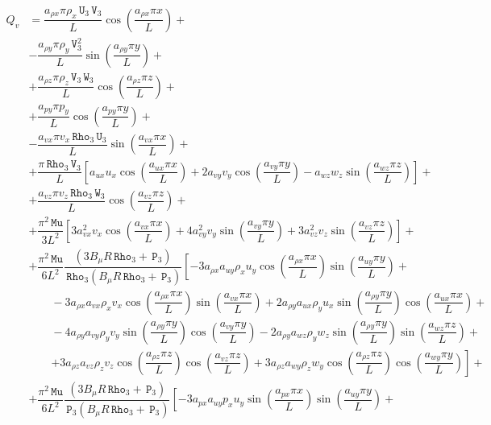 \documentclass[10pt]{article}
\newcommand{\Rho}{\,\mathtt{Rho}}
\newcommand{\PP}{\,\mathtt{P}}
\newcommand{\U}{\,\mathtt{U}}
\newcommand{\V}{\,\mathtt{V}}
\newcommand{\W}{\,\mathtt{W}}
\newcommand{\MU}{\,\mathtt{Mu}}
\begin{document}
\begin{equation}
 \begin{split}
Q_v &= \dfrac{a_{\rho x} \pi \rho_x \U_3 \V_3 }{L}\cos\left(\dfrac{a_{\rho x} \pi x}{L}\right)+\\
&-\dfrac{a_{\rho y} \pi \rho_y \V_3^2 }{L}\sin\left(\dfrac{a_{\rho y} \pi y}{L}\right)+\\
&+\dfrac{a_{\rho z} \pi \rho_z \V_3 \W_3 }{L}\cos\left(\dfrac{a_{\rho z}\pi z }{L}\right)+\\
&+\dfrac{a_{py} \pi p_y }{L}\cos\left(\dfrac{a_{py} \pi y}{L}\right)+\\
&-\dfrac{a_{vx} \pi v_x \Rho_3 \U_3 }{L}\sin\left(\dfrac{a_{vx} \pi x}{L}\right)+\\
&+\dfrac{\pi \Rho_3 \V_3}{L}\left[a_{ux} u_x \cos\left(\dfrac{a_{ux} \pi x}{L}\right)+2 a_{vy} v_y \cos\left(\dfrac{a_{vy} \pi y}{L}\right)-a_{wz} w_z \sin\left(\dfrac{a_{wz}\pi z }{L}\right)\right]+\\
&+\dfrac{a_{vz} \pi v_z \Rho_3 \W_3 }{L}\cos\left(\dfrac{a_{vz}\pi z }{L}\right)+\\
&+ \dfrac{ \pi^2 \MU }{3L^2}\left[3 a_{vx}^2 v_x \cos\left(\dfrac{a_{vx} \pi x}{L}\right)+4 a_{vy}^2 v_y \sin\left(\dfrac{a_{vy} \pi y}{L}\right)+3 a_{vz}^2 v_z \sin\left(\dfrac{a_{vz} \pi z}{L}\right)\right]  +\\
%
&+\dfrac{ \pi^2 \MU}{6L^2}\dfrac{ (3 B_\mu R \Rho_3+\PP_3)}{\Rho_3 (B_\mu R \Rho_3+\PP_3) }\left[-3 a_{\rho x} a_{uy} \rho_x u_y \cos\left(\dfrac{a_{\rho x} \pi x}{L}\right) \sin\left(\dfrac{a_{uy} \pi y}{L}\right)\right.+\\
    &\qquad-3 a_{\rho x} a_{vx} \rho_x v_x \cos\left(\dfrac{a_{\rho x} \pi x}{L}\right) \sin\left(\dfrac{a_{vx} \pi x}{L}\right)+2 a_{\rho y} a_{ux} \rho_y u_x \sin\left(\dfrac{a_{\rho y} \pi y}{L}\right) \cos\left(\dfrac{a_{ux} \pi x}{L}\right)+\\
    &\qquad-4 a_{\rho y} a_{vy} \rho_y v_y \sin\left(\dfrac{a_{\rho y} \pi y}{L}\right) \cos\left(\dfrac{a_{vy} \pi y}{L}\right)-2 a_{\rho y} a_{wz} \rho_y w_z \sin\left(\dfrac{a_{\rho y} \pi y}{L}\right) \sin\left(\dfrac{a_{wz} \pi z}{L}\right)+\\
    &\qquad\left.+3 a_{\rho z} a_{vz} \rho_z v_z \cos\left(\dfrac{a_{\rho z} \pi z}{L}\right) \cos\left(\dfrac{a_{vz} \pi z}{L}\right)+3 a_{\rho z} a_{wy} \rho_z w_y \cos\left(\dfrac{a_{\rho z} \pi z}{L}\right) \cos\left(\dfrac{a_{wy} \pi y}{L}\right)\right]   +\\
%
&+  \dfrac{ \pi^2 \MU }{6L^2}\dfrac{(3 B_\mu R \Rho_3+\PP_3)}{\PP_3  (B_\mu R \Rho_3+\PP_3) }\left[-3 a_{px} a_{uy} p_x u_y \sin\left(\dfrac{a_{px} \pi x}{L}\right) \sin\left(\dfrac{a_{uy} \pi y}{L}\right)\right.+\\

\end{split}
\end{equation}
\end{document}
